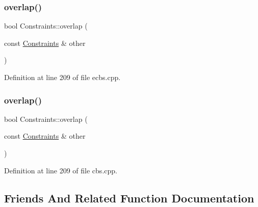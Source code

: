 \mbox{\label{struct_constraints_a26075165568016b81a1a2af36d8c6cce}} 
\subsubsection{\texorpdfstring{overlap()}{overlap()}\hspace{0.1cm}{\footnotesize\ttfamily [1/2]}}
{\footnotesize\ttfamily bool Constraints\+::overlap (\begin{DoxyParamCaption}\item[{const \hyperlink{struct_constraints}{Constraints} \&}]{other }\end{DoxyParamCaption})\hspace{0.3cm}{\ttfamily [inline]}}



Definition at line 209 of file ecbs.\+cpp.

\mbox{\label{struct_constraints_a26075165568016b81a1a2af36d8c6cce}} 
\subsubsection{\texorpdfstring{overlap()}{overlap()}\hspace{0.1cm}{\footnotesize\ttfamily [2/2]}}
{\footnotesize\ttfamily bool Constraints\+::overlap (\begin{DoxyParamCaption}\item[{const \hyperlink{struct_constraints}{Constraints} \&}]{other }\end{DoxyParamCaption})\hspace{0.3cm}{\ttfamily [inline]}}



Definition at line 209 of file cbs.\+cpp.



\subsection{Friends And Related Function Documentation}
\mbox{\label{struct_constraints_a609a032077973e41f300c88a62d8f6fa}} 
